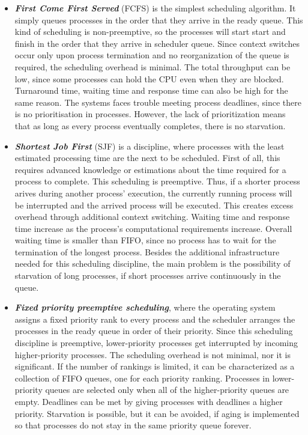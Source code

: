 \documentclass[diploma]{Styles/softlab-thesis}
\begin{document}
\begin{itemize}
\item \textbf{\emph{First Come First Served}} (FCFS) is the simplest scheduling algorithm. It simply queues processes in the order that they arrive in the ready queue. This kind of scheduling is non-preemptive, so the processes will start start and finish in the order that they arrive in scheduler queue. Since context switches occur only upon process termination and no reorganization of the queue is required, the scheduling overhead is minimal. The total throughput can be low, since some processes can hold the CPU even when they are blocked. Turnaround time, waiting time and response time can also be high for the same reason. The systems faces trouble meeting process deadlines, since there is no prioritisation in processes. However, the lack of prioritization means that as long as every process eventually completes, there is no starvation. \\

\item \textbf{\emph{Shortest Job First}} (SJF) is a discipline, where processes with the least estimated processing time are the next to be scheduled. First of all, this requires advanced knowledge or estimations about the time required for a process to complete. This scheduling is preemptive. Thus, if a shorter process arives during another process' execution, the currently running process will be interrupted and the arrived process will be executed. This creates excess overhead through additional context switching. Waiting time and response time increase as the process's computational requirements increase.  Overall waiting time is smaller than FIFO, since no process has to wait for the termination of the longest process. Besides the additional infrastructure needed for this scheduling discipline, the main problem is the possibility of starvation of long processes, if short processes arrive continuously in the queue. \\

\item \textbf{\emph{Fixed priority preemptive scheduling}}, where the operating system assigns a fixed priority rank to every process and the scheduler arranges the processes in the ready queue in order of their priority. Since this scheduling discipline is preemptive, lower-priority processes get interrupted by incoming higher-priority processes. The scheduling overhead is not minimal, nor it is significant. If the number of rankings is limited, it can be characterized as a collection of FIFO queues, one for each priority ranking. Processes in lower-priority queues are selected only when all of the higher-priority queues are empty. Deadlines can be met by giving processes with deadlines a higher priority. Starvation is possible, but it can be avoided, if aging is implemented so that processes do not stay in the same priority queue forever. \\


\end{itemize}
\end{document}
